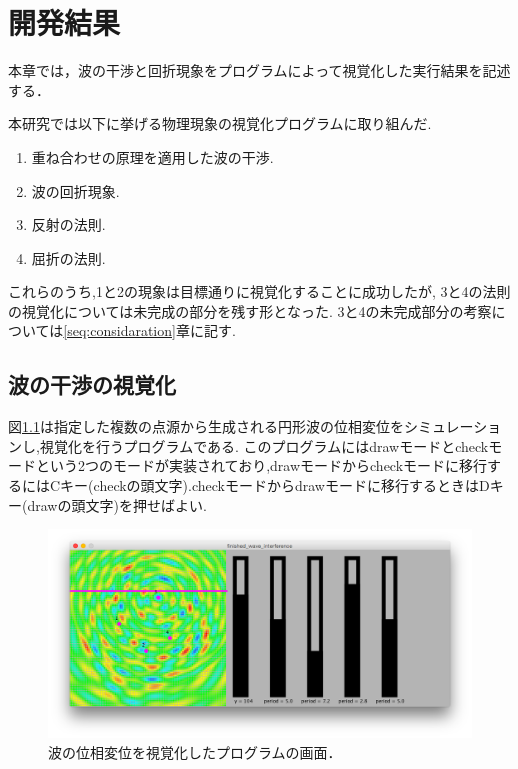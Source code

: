\chapter{開発結果}

本章では，波の干渉と回折現象をプログラムによって視覚化した実行結果を記述する．

本研究では以下に挙げる物理現象の視覚化プログラムに取り組んだ.
\begin{enumerate}
\item 重ね合わせの原理を適用した波の干渉.
\item 波の回折現象.
\item 反射の法則.
\item 屈折の法則.
\end{enumerate}
これらのうち,1と2の現象は目標通りに視覚化することに成功したが, 3と4の法則の視覚化については未完成の部分を残す形となった. 3と4の未完成部分の考察については\ref{seq:considaration}章に記す.


\section{波の干渉の視覚化}
図\ref{fig:4wave}は指定した複数の点源から生成される円形波の位相変位をシミュレーションし,視覚化を行うプログラムである.
このプログラムにはdrawモードとcheckモードという2つのモードが実装されており,drawモードからcheckモードに移行するにはCキー(checkの頭文字).checkモードからdrawモードに移行するときはDキー(drawの頭文字)を押せばよい.


\begin{figure}[H]
 \begin{center}
  \includegraphics[width=\linewidth]{../result/4wave.png}
 \end{center}
 \caption{波の位相変位を視覚化したプログラムの画面．}
 \label{fig:4wave}
\end{figure}






